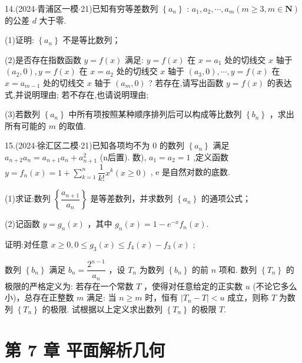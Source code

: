 14.(2024$\cdot$青浦区一模$\cdot$21)已知有穷等差数列 $\left\{  {a}_{n}\right\}$ : ${a}_{1},{a}_{2},\cdots ,{a}_{m}\left( {m \geq  3,m \in  \mathbf{N}}\right)$ 的公差 $d$ 大于零.

(1)证明: $\left\{  {a}_{n}\right\}$ 不是等比数列；

(2)是否存在指数函数 $y = f\left( x\right)$ 满足: $y = f\left( x\right)$ 在 $x = {a}_{1}$ 处的切线交 $x$ 轴于 $\left( {{a}_{2},0}\right) ,y = f\left( x\right)$ 在 $x = {a}_{2}$ 处的切线交 $x$ 轴于 $\left( {{a}_{3},0}\right) ,\cdots ,y = f\left( x\right)$ 在 $x = {a}_{m - 1}$ 处的切线交 $x$ 轴于 $\left( {{a}_{m},0}\right)$ ? 若存在,请写出函数 $y = f\left( x\right)$ 的表达式,并说明理由; 若不存在,也请说明理由;

(3)若数列 $\left\{  {a}_{n}\right\}$ 中所有项按照某种顺序排列后可以构成等比数列 $\left\{  {b}_{n}\right\}$ ，求出所有可能的 $m$ 的取值.

15.(2024$\cdot$徐汇区二模$\cdot$21)已知各项均不为 0 的数列 $\left\{  {a}_{n}\right\}$ 满足 ${a}_{n + 2}{a}_{n} = {a}_{n + 1}{a}_{n} + {a}_{n + 1}^{2}$ (n后置). 数), ${a}_{1} = {a}_{2} = 1$ ,定义函数 $y = {f}_{n}\left( x\right)  = 1 + \mathop{\sum }\limits_{{k = 1}}^{n}\dfrac{1}{k!}{x}^{k}\left( {x \geq  0}\right)$ , e 是自然对数的底数.

(1)求证:数列 $\left\{  \dfrac{{a}_{n + 1}}{{a}_{n}}\right\}$ 是等差数列，并求数列 $\left\{  {a}_{n}\right\}$ 的通项公式；

(2)记函数 $y = {g}_{n}\left( x\right)$ ，其中 ${g}_{n}\left( x\right)  = 1 - {{e}}^{-x}{f}_{n}\left( x\right)$.

   证明:对任意 $x \geq  0,0 \leq  {g}_{3}\left( x\right)  \leq  {f}_{4}\left( x\right)  - {f}_{3}\left( x\right)$ ;

   数列 $\left\{  {b}_{n}\right\}$ 满足 ${b}_{n} = \dfrac{{2}^{n - 1}}{{a}_{n}}$ ，设 ${T}_{n}$ 为数列 $\left\{  {b}_{n}\right\}$ 的前 $n$ 项和. 数列 $\left\{  {T}_{n}\right\}$ 的极限的严格定义为: 若存在一个常数 $T$ ，使得对任意给定的正实数 $u$ (不论它多么小)，总存在正整数 $m$ 满足: 当 $n \geq  m$ 时，恒有 $\left| {{T}_{n} - T}\right|  < u$ 成立，则称 $T$ 为数列 $\left\{  {T}_{n}\right\}$ 的极限. 试根据以上定义求出数列 $\left\{  {T}_{n}\right\}$ 的极限 $T$.

\section*{第 7 章 平面解析几何}

